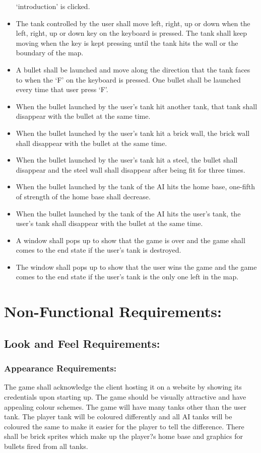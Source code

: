\documentclass{article}
\begin{document}
\begin{itemize}
`introduction' is clicked.
\item The tank controlled by the user shall move left, right, up or down when 
the left, right, up or down key on the keyboard is pressed. The tank shall keep
 moving when the key is kept pressing until the tank hits the wall or the 
 boundary of the map.
\item A bullet shall be launched and move along the direction that the tank
 faces to when the `F' on the keyboard is pressed. One bullet shall be launched 
 every time that user press `F'.
\item When the bullet launched by the user's tank hit another tank, that tank 
shall disappear with the bullet at the same time.
\item When the bullet launched by the user's tank hit a brick wall, the brick 
wall shall disappear with the bullet at the same time.
\item When the bullet launched by the user's tank hit a steel, the bullet shall 
disappear and the steel wall shall disappear after being fit for three times.
\item When the bullet launched by the tank of the AI hits the  home base, 
one-fifth of strength of the home base shall decrease.
\item When the bullet launched by the tank of the AI hits the user's tank, 
 the user's tank shall disappear with the bullet at the same time.
\item A window shall pops up to show that the game is over and the game shall
 comes to the end state if the user's tank is destroyed.
\item The window shall pops up to show that the user wins the game and the game
 comes to the end state if the user's tank is the only one left in the map.
\end{itemize}

\section{Non-Functional Requirements:}
\subsection{Look and Feel Requirements:}

\subsubsection{Appearance Requirements:}
The game shall acknowledge the client hosting it on a website by showing its
credentials upon starting up. The game should be visually attractive and have
appealing colour schemes. The game will have many tanks other than the user
tank. The player tank will be coloured differently and all AI tanks will be
coloured the same to make it easier for the player to tell the difference. There
shall be brick sprites which make up the player?s home base and graphics for
bullets fired from all tanks.
\end{document}
